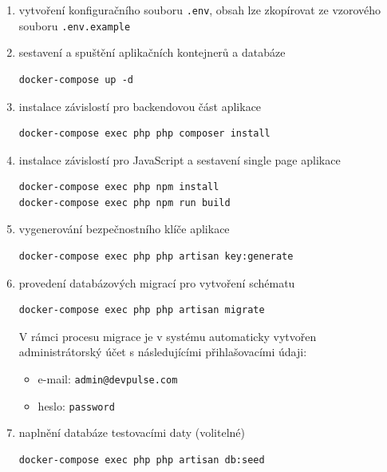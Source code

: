 \begin{enumerate}
    \item vytvoření konfiguračního souboru \texttt{.env}, obsah lze zkopírovat ze vzorového souboru \texttt{.env.example}

    \item sestavení a spuštění aplikačních kontejnerů a databáze
    \begin{verbatim}
docker-compose up -d
    \end{verbatim}

    \item instalace závislostí pro backendovou část aplikace
    \begin{verbatim}
docker-compose exec php php composer install
    \end{verbatim}

    \item instalace závislostí pro JavaScript a sestavení single page aplikace
    \begin{verbatim}
docker-compose exec php npm install
docker-compose exec php npm run build
    \end{verbatim}

    \item vygenerování bezpečnostního klíče aplikace
    \begin{verbatim}
docker-compose exec php php artisan key:generate
    \end{verbatim}

    \item provedení databázových migrací pro vytvoření schématu
    \begin{verbatim}
docker-compose exec php php artisan migrate
    \end{verbatim}

    V rámci procesu migrace je v systému automaticky vytvořen administrátorský účet s následujícími přihlašovacími údaji:
    \vspace{-2mm}
    \begin{itemize}
        \item e-mail: \texttt{admin@devpulse.com}
        \item heslo: \texttt{password}
    \end{itemize}

    \item naplnění databáze testovacími daty (volitelné)
    \begin{verbatim}
docker-compose exec php php artisan db:seed 
    \end{verbatim}
\end{enumerate}

